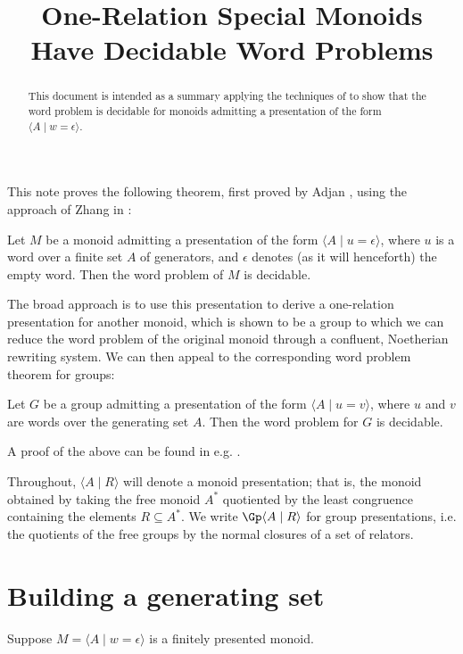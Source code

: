 \documentclass[libertine,widepage,nosubthm]{lmaths}
\title{One-Relation Special Monoids Have Decidable Word Problems}
\author{}
\date{}
\begin{document}
\maketitle

\begin{abstract}%
This document is intended as a summary applying the techniques of \cite{Zhang1992a} to show that the word problem is decidable for monoids admitting a presentation of the form $\langle A \mid w = \epsilon\rangle$.
\end{abstract}


This note proves the following theorem, first proved by Adjan \cite{Adian1966}, using the approach of Zhang in \cite{Zhang1992a}:
\begin{theorem}[Adjan] \label{thm:ors-decidablewp}
	Let $M$ be a monoid admitting a presentation of the form $\langle A \mid u = \epsilon\rangle$, where $u$ is a word over a finite set $A$ of generators, and $\epsilon$ denotes (as it will henceforth) the empty word. Then the word problem of $M$ is decidable.
\end{theorem}

The broad approach is to use this presentation to derive a one-relation presentation for another monoid, which is shown to be a group to which we can reduce the word problem of the original monoid through a confluent, Noetherian rewriting system. We can then appeal to the corresponding word problem theorem for groups:
\begin{theorem}[Magnus] \label{thm:orgp-decidablewp}
	Let $G$ be a group admitting a presentation of the form $\langle A \mid u = v\rangle$, where $u$ and $v$ are words over the generating set $A$. Then the word problem for $G$ is decidable.
\end{theorem}

A proof of the above can be found in e.g. \cite{Magnus2004}.

Throughout, $\langle A \mid R \rangle$ will denote a monoid presentation; that is, the monoid obtained by taking the free monoid $A^*$ quotiented by the least congruence containing the elements $R \subseteq A^*$. We write $\Gp \langle A \mid R \rangle$ for group presentations, i.e. the quotients of the free groups by the normal closures of a set of relators.


\section{Building a generating set}

Suppose $M = \langle A \mid w = \epsilon\rangle$ is a finitely presented monoid.
\end{document}
